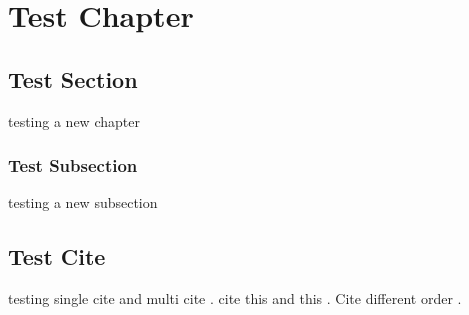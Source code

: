 \chapter{Test Chapter}
\section{Test Section}
testing a new chapter
\subsection{Test Subsection}
testing a new subsection
\section{Test Cite}
testing single cite \cite{candlerRateEffectsHypersonic2019} and multi cite \cite{candlerRateEffectsHypersonic2019,boydNonequilibriumGasDynamics2017,mossSurveyBluntBody1997}. cite this \cite{boydNonequilibriumGasDynamics2017} and this \cite{mossSurveyBluntBody1997}. Cite different order \cite{candlerRateEffectsHypersonic2019,mossSurveyBluntBody1997}.
